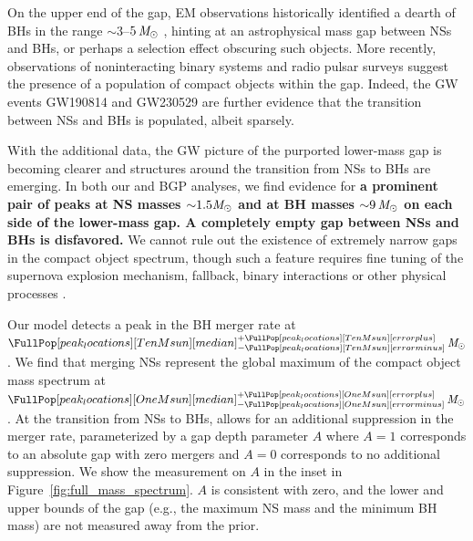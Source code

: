 On the upper end of the gap, \ac{EM} observations historically identified a dearth of \acp{BH} in the range $\sim 3$--$5\,\mathit{M_\odot}$ \citep{Bailyn:1997xt, Ozel:2010su, Farr:2010tu}, hinting at an astrophysical mass gap between \acp{NS} and \acp{BH}, or perhaps a selection effect obscuring such objects. 
More recently, observations of noninteracting binary systems \citep{Thompson:2018ycv, Jayasinghe:2021uqb} and radio pulsar surveys \citep{Barr:2024wwl} suggest the presence of a population of compact objects within the gap.
Indeed, the \ac{GW} events GW190814 \citep{LIGOScientific:2020zkf} and GW230529 \citep{LIGOScientific:2024elc} are further evidence that the transition between \acp{NS} and \acp{BH} is populated, albeit sparsely. 

With the additional \gwtcfour data, the \ac{GW} picture of the purported lower-mass gap is becoming clearer and structures around the transition from \acp{NS} to \acp{BH} are emerging.
In both our \parametricAdj \PDB and \nonparametricAdj \ac{BGP} analyses, we find evidence for \textbf{a prominent pair of peaks at \ac{NS} masses $\bm{{\sim}1.5\Msun}$ and at \ac{BH} masses $\bm{{\sim}9\,\Msun}$ on each side of the lower-mass gap.
A completely empty gap between \acp{NS} and \acp{BH} is disfavored.}  
We cannot rule out the existence of extremely narrow gaps in the compact object spectrum, though such a feature requires fine tuning of the supernova explosion mechanism, fallback, binary interactions or other physical processes \citep[e.g.,][]{Fryer:2011cx,Belczynski:2011bn}.

Our \PDB model detects a peak in the \ac{BH} merger rate at $\FullPop[peak_locations][TenMsun][median]^{+\FullPop[peak_locations][TenMsun][error plus]}_{-\FullPop[peak_locations][TenMsun][error minus]}\,\Msun$.
We find that merging \acp{NS} represent the global maximum of the compact object mass spectrum at $\FullPop[peak_locations][OneMsun][median]^{+\FullPop[peak_locations][OneMsun][error plus]}_{-\FullPop[peak_locations][OneMsun][error minus]}\,\Msun$. 
At the transition from \acp{NS} to \acp{BH}, \PDB allows for an additional suppression in the merger rate, parameterized by a gap depth parameter $A$ where $A=1$ corresponds to an absolute gap with zero mergers and $A=0$ corresponds to no additional suppression. %
We show the measurement on $A$ in the inset in Figure~\ref{fig:full_mass_spectrum}. $A$ is consistent with zero, and the lower and upper bounds of the gap (e.g., the maximum \ac{NS} mass and the minimum \ac{BH} mass) are not measured away from the prior. 

